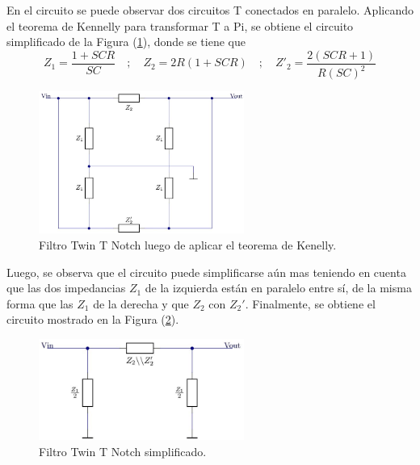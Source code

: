 \documentclass[a4paper]{article}
\begin{document}
En el circuito se puede observar dos circuitos T conectados en paralelo. Aplicando el teorema de Kennelly para transformar T a Pi, se obtiene el circuito simplificado de la Figura (\ref{fig:filtrosimplificado}), donde se tiene que
\[Z_1=\frac{1+SCR}{SC}\hspace{1em};\hspace{1em} Z_2=2R(1+SCR) \hspace{1em};\hspace{1em} Z'_2=\frac{2(SCR+1)}{R(SC)^2}\]

\begin{figure}[H]
	\centering
	\includegraphics[width=0.6\textwidth, trim={0 0.1cm  0 0},clip]{ej1kennellly.jpg}
\caption{Filtro Twin T Notch luego de aplicar el teorema de Kenelly.}
	\label{fig:filtrosimplificado}
\end{figure}

Luego, se observa que el circuito puede simplificarse aún mas teniendo en cuenta que las dos impedancias $Z_1$ de la izquierda están en paralelo entre sí, de la misma forma que las $Z_1$ de la derecha y que $Z_2$ con $Z_2'$. Finalmente, se obtiene el circuito mostrado en la Figura (\ref{fig:filtrofinal}).

\begin{figure}[H]
	\centering
	\includegraphics[width=0.6\textwidth]{ej1simplificado.jpg}
\caption{Filtro Twin T Notch simplificado.}
	\label{fig:filtrofinal}
\end{figure}
\end{document}
